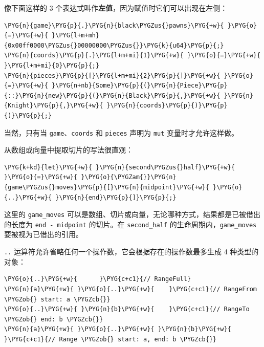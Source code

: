 像下面这样的 3 个表达式叫作\textbf{左值}，因为赋值时它们可以出现在左侧：

\begin{Verbatim}[commandchars=\\\{\},breaklines=true,breakanywhere=true,fontsize=\codefont,xleftmargin=17bp]
\PYG{n}{game}\PYG{p}{.}\PYG{n}{black\PYGZus{}pawns}\PYG{+w}{ }\PYG{o}{=}\PYG{+w}{ }\PYG{l+m+mh}{0x00ff0000\PYGZus{}00000000\PYGZus{}}\PYG{k}{u64}\PYG{p}{;}
\PYG{n}{coords}\PYG{p}{.}\PYG{l+m+mi}{1}\PYG{+w}{ }\PYG{o}{=}\PYG{+w}{ }\PYG{l+m+mi}{0}\PYG{p}{;}
\PYG{n}{pieces}\PYG{p}{[}\PYG{l+m+mi}{2}\PYG{p}{]}\PYG{+w}{ }\PYG{o}{=}\PYG{+w}{ }\PYG{n+nb}{Some}\PYG{p}{(}\PYG{n}{Piece}\PYG{p}{::}\PYG{n}{new}\PYG{p}{(}\PYG{n}{Black}\PYG{p}{,}\PYG{+w}{ }\PYG{n}{Knight}\PYG{p}{,}\PYG{+w}{ }\PYG{n}{coords}\PYG{p}{)}\PYG{p}{)}\PYG{p}{;}
\end{Verbatim}

当然，只有当 \texttt{game}、\texttt{coords} 和 \texttt{pieces} 声明为 \texttt{mut} 变量时才允许这样做。

从数组或向量中提取切片的写法很直观：

\begin{Verbatim}[commandchars=\\\{\},breaklines=true,breakanywhere=true,fontsize=\codefont,xleftmargin=17bp]
\PYG{k+kd}{let}\PYG{+w}{ }\PYG{n}{second\PYGZus{}half}\PYG{+w}{ }\PYG{o}{=}\PYG{+w}{ }\PYG{o}{\PYGZam{}}\PYG{n}{game\PYGZus{}moves}\PYG{p}{[}\PYG{n}{midpoint}\PYG{+w}{ }\PYG{o}{..}\PYG{+w}{ }\PYG{n}{end}\PYG{p}{]}\PYG{p}{;}
\end{Verbatim}

这里的 \texttt{game\_moves} 可以是数组、切片或向量，无论哪种方式，结果都是已被借出的长度为 \texttt{end - midpoint} 的切片。在 \texttt{second\_half} 的生命周期内，\texttt{game\_moves} 要被视为已借出的引用。

\texttt{..} 运算符允许省略任何一个操作数，它会根据存在的操作数最多生成 4 种类型的对象：

\begin{Verbatim}[commandchars=\\\{\},breaklines=true,breakanywhere=true,fontsize=\codefont,xleftmargin=17bp]
\PYG{o}{..}\PYG{+w}{      }\PYG{c+c1}{// RangeFull}
\PYG{n}{a}\PYG{+w}{ }\PYG{o}{..}\PYG{+w}{    }\PYG{c+c1}{// RangeFrom \PYGZob{} start: a \PYGZcb{}}
\PYG{o}{..}\PYG{+w}{ }\PYG{n}{b}\PYG{+w}{    }\PYG{c+c1}{// RangeTo \PYGZob{} end: b \PYGZcb{}}
\PYG{n}{a}\PYG{+w}{ }\PYG{o}{..}\PYG{+w}{ }\PYG{n}{b}\PYG{+w}{  }\PYG{c+c1}{// Range \PYGZob{} start: a, end: b \PYGZcb{}}
\end{Verbatim}

